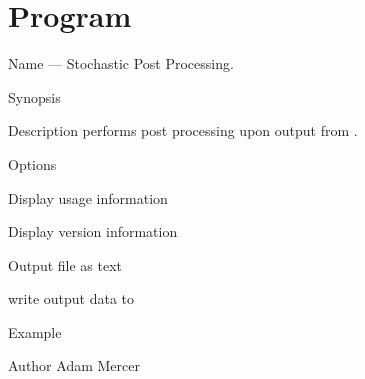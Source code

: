 \clearpage
\section{Program }
\label{program:lalapps-stopp}

\begin{entry}
\item[Name]
 --- Stochastic Post Processing.

\item[Synopsis]
  \newline \hspace*{0.5in}
 \newline \hspace*{0.5in}
 \newline \hspace*{0.5in}
 \newline \hspace*{0.5in}
 

\item[Description]  performs post processing upon
output from .

\item[Options]\leavevmode
\begin{entry}
\item[\option{--help}]
Display usage information
\item[\option{--version}]
Display version information
\item[\option{--text}]
Output file as text
\item[\option{--output} \parm{FILE}]
write output data to 
\end{entry}

\item[Example]

\item[Author]
Adam Mercer
\end{entry}

